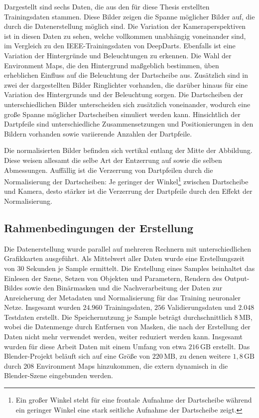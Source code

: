Dargestellt sind sechs Daten, die aus den für diese Thesis erstellten Trainingsdaten stammen. Diese Bilder zeigen die Spanne möglicher Bilder auf, die durch die Datenerstellung möglich sind. Die Variation der Kameraperspektiven ist in diesen Daten zu sehen, welche vollkommen unabhängig voneinander sind, im Vergleich zu den IEEE-Trainingsdaten von DeepDarts. Ebenfalls ist eine Variation der Hintergründe und Beleuchtungen zu erkennen. Die Wahl der Environment Maps, die den Hintergrund maßgeblich bestimmen, üben erheblichen Einfluss auf die Beleuchtung der Dartscheibe aus. Zusätzlich sind in zwei der dargestellten Bilder Ringlichter vorhanden, die darüber hinaus für eine Variation des Hintergrunds und der Beleuchtung sorgen. Die Dartscheiben der unterschiedlichen Bilder unterscheiden sich zusätzlich voneinander, wodurch eine große Spanne möglicher Dartscheiben simuliert werden kann. Hinsichtlich der Dartpfeile sind unterschiedliche Zusammensetzungen und Positionierungen in den Bildern vorhanden sowie variierende Anzahlen der Dartpfeile.

Die normalisierten Bilder befinden sich vertikal entlang der Mitte der Abbildung. Diese weisen allesamt die selbe Art der Entzerrung auf sowie die selben Abmessungen. Auffällig ist die Verzerrung von Dartpfeilen durch die Normalisierung der Dartscheiben: Je geringer der Winkel\footnote{Ein großer Winkel steht für eine frontale Aufnahme der Dartscheibe während ein geringer Winkel eine stark seitliche Aufnahme der Dartscheibe zeigt.} zwischen Dartscheibe und Kamera, desto stärker ist die Verzerrung der Dartpfeile durch den Effekt der Normalisierung.


\subsection{Rahmenbedingungen der Erstellung}  %
\label{sec:render_info}

Die Datenerstellung wurde parallel auf mehreren Rechnern mit unterschiedlichen Grafikkarten ausgeführt. Als Mittelwert aller Daten wurde eine Erstellungszeit von 30 Sekunden je Sample ermittelt. Die Erstellung eines Samples beinhaltet das Einlesen der Szene, Setzen von Objekten und Parametern, Rendern des Output-Bildes sowie den Binärmasken und die Nachverarbeitung der Daten zur Anreicherung der Metadaten und Normalisierung für das Training neuronaler Netze. Insgesamt wurden $24.960$ Trainingsdaten, $256$ Validierungsdaten und $2.048$ Testdaten erstellt. Die Speichernutzung je Sample beträgt durchschnittlich 8\,MB, wobei die Datenmenge durch Entfernen von Masken, die nach der Erstellung der Daten nicht mehr verwendet werden, weiter reduziert werden kann. Insgesamt wurden für diese Arbeit Daten mit einem Umfang von etwa $216\,\text{GB}$ erstellt. Das Blender-Projekt beläuft sich auf eine Größe von $220\,\text{MB}$, zu denen weitere $1,8\,\text{GB}$ durch 208 Environment Maps hinzukommen, die extern dynamisch in die Blender-Szene eingebunden werden.

